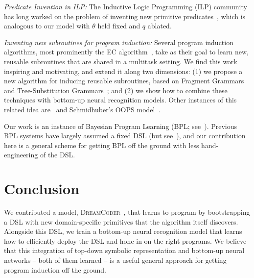 \documentclass{article}
\newcommand{\system}{\textsc{DreamCoder}~}
\begin{document}
 \noindent \emph{Predicate Invention in ILP:} The Inductive Logic Programming (ILP) community
 has long worked on the problem of inventing new primitive predicates~\cite{DBLP:conf/ecai/LinDETM14,muggleton2015meta}, which is analogous to our model with $\theta$ held fixed and $q$ ablated.

 \noindent \emph{Inventing new subroutines for program induction:}
 Several program induction algorithms, most prominently the EC algorithm~\cite{Dechter:2013:BLV:2540128.2540316}, take as their goal to learn new, reusable subroutines that are shared in a multitask setting. We find this work inspiring and motivating,
 and extend it along two dimensions: (1) we propose a new algorithm for
 inducing reusable subroutines, based on Fragment Grammars~\cite{tim} and Tree-Substitution Grammars~\cite{cohn2010inducing};
 and (2) we show how to combine these techniques with bottom-up neural recognition models.
 Other instances of this related idea are~\cite{DBLP:conf/icml/LiangJK10} and Schmidhuber's OOPS model~\cite{schmidhuber2004optimal}.
 
 Our work is an instance of
 Bayesian Program
 Learning (BPL; see~\citep{lake2013one,Dechter:2013:BLV:2540128.2540316,ellis2016sampling,DBLP:conf/icml/LiangJK10}). Previous BPL systems have largely assumed a fixed DSL (but see~\cite{DBLP:conf/icml/LiangJK10}),
 and our contribution here is a general scheme for getting BPL off the ground with less hand-engineering of the DSL.
 
 \section{Conclusion}
 We contributed a model, \system, that learns to program by
 bootstrapping a DSL with new domain-specific primitives that the algorithm itself discovers.
  Alongside this DSL, we train a bottom-up
 neural recognition model that learns how to efficiently deploy the
 DSL and hone in on the right programs.  We believe that this
 integration of top-down symbolic representation and bottom-up neural
 networks -- both of them learned -- is a useful general approach for
 getting program induction off the ground. 
  

\pagebreak





\end{document}
